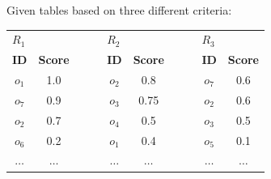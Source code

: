 \begin{example}
    Given tables based on three different criteria:
    \begin{table}[H]
        \centering
        \begin{tabular}{cccccccc}
        \multicolumn{1}{l}{$R_1$}                 & \multicolumn{1}{l}{}                & \multicolumn{1}{l}{$\:\:\:\:\:\:$} & \multicolumn{1}{l}{$R_2$}                & \multicolumn{1}{l}{}                & \multicolumn{1}{l}{$\:\:\:\:\:\:$} & \multicolumn{1}{l}{$R_3$}                & \multicolumn{1}{l}{}                \\ \cline{1-2} \cline{4-5} \cline{7-8} 
        \multicolumn{1}{|c}{\textbf{ID}} & \multicolumn{1}{c|}{\textbf{Score}} & \multicolumn{1}{c|}{\textbf{}}     & \multicolumn{1}{c}{\textbf{ID}} & \multicolumn{1}{c|}{\textbf{Score}} & \multicolumn{1}{c|}{\textbf{}}     & \multicolumn{1}{c}{\textbf{ID}} & \multicolumn{1}{c|}{\textbf{Score}} \\ \cline{1-2} \cline{4-5} \cline{7-8} 
        \multicolumn{1}{|c}{$o_1$}               & \multicolumn{1}{c|}{1.0}            & \multicolumn{1}{c|}{}              & \multicolumn{1}{c}{$o_2$}               & \multicolumn{1}{c|}{0.8}            & \multicolumn{1}{c|}{}              & \multicolumn{1}{c}{$o_7$}               & \multicolumn{1}{c|}{0.6}            \\  
        \multicolumn{1}{|c}{$o_7$}               & \multicolumn{1}{c|}{0.9}            & \multicolumn{1}{c|}{}              & \multicolumn{1}{c}{$o_3$}               & \multicolumn{1}{c|}{0.75}           & \multicolumn{1}{c|}{}              & \multicolumn{1}{c}{$o_2$}               & \multicolumn{1}{c|}{0.6}            \\  
        \multicolumn{1}{|c}{$o_2$}               & \multicolumn{1}{c|}{0.7}            & \multicolumn{1}{c|}{}              & \multicolumn{1}{c}{$o_4$}               & \multicolumn{1}{c|}{0.5}            & \multicolumn{1}{c|}{}              & \multicolumn{1}{c}{$o_3$}               & \multicolumn{1}{c|}{0.5}            \\  
        \multicolumn{1}{|c}{$o_6$}               & \multicolumn{1}{c|}{0.2}            & \multicolumn{1}{c|}{}              & \multicolumn{1}{c}{$o_1$}               & \multicolumn{1}{c|}{0.4}            & \multicolumn{1}{c|}{}              & \multicolumn{1}{c}{$o_5$}               & \multicolumn{1}{c|}{0.1}            \\  
        \multicolumn{1}{|c}{$\dots$}             & \multicolumn{1}{c|}{$\dots$}        & \multicolumn{1}{c|}{}              & \multicolumn{1}{c}{$\dots$}             & \multicolumn{1}{c|}{$\dots$}        & \multicolumn{1}{c|}{}              & \multicolumn{1}{c}{$\dots$}             & \multicolumn{1}{c|}{$\dots$}        \\ \cline{1-2} \cline{4-5} \cline{7-8} 

\end{tabular}
\end{table}
\end{example}
